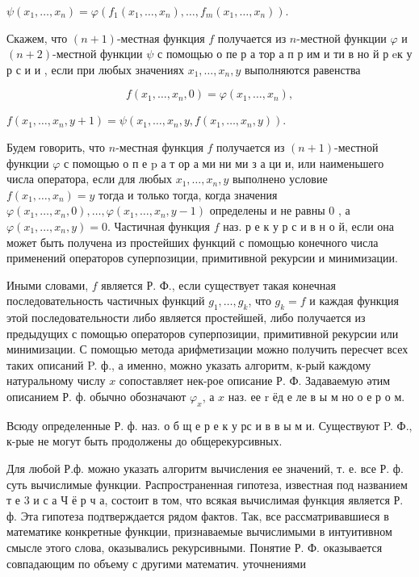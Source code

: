 \documentclass[10pt]{article}
\begin{document}
$\psi\left(x_{1}, \ldots, x_{n}\right)=\varphi\left(f_{1}\left(x_{1}, \ldots, x_{n}\right), \ldots, f_{m}\left(x_{1}, \ldots, x_{n}\right)\right)$.



Скажем, что $(n+1)$-местная функция $f$ получается из $n$-местной функции $\varphi$ и $(n+2)$-местной функции $\psi$ с помощью о пе р а тор а п р им и ти в но й р eк у р с и и , если при любых значениях $x_{1}, \ldots, x_{n}, y$ выполняются равенства



\[

f\left(x_{1}, \ldots, x_{n}, 0\right)=\varphi\left(x_{1}, \ldots, x_{n}\right),

\]



$f\left(x_{1}, \ldots, x_{n}, y+1\right)=\psi\left(x_{1}, \ldots, x_{n}, y, f\left(x_{1}, \ldots, x_{n}, y\right)\right)$.



Будем говорить, что $n$-местная функция $f$ получается из $(n+1)$-местной функции $\varphi$ с помощью о п е $\mathrm{p}$ а т ор а ми ни ми з а ци и, или наименьшего числа оператора, если для любых $x_{1}, \ldots, x_{n}, y$ выполнено условие $f\left(x_{1}, \ldots, x_{n}\right)=y$ тогда и только тогда, когда значения $\varphi\left(x_{1}, \ldots, x_{n}, 0\right), \ldots, \varphi\left(x_{1}, \ldots, x_{n}, y-1\right)$ определены и не равны 0 , а $\varphi\left(x_{1}, \ldots, x_{n}, y\right)=0$. Частичная функция $f$ наз. р е к у р с и в н о й, если она может быть получена из простейших функций с помощью конечного числа применений операторов суперпозиции, примитивной рекурсии и минимизации.



Иными словами, $f$ является Р. Ф., если существует такая конечная последовательность частичных функций $g_{1}, \ldots, g_{k}$, что $g_{k}=f$ и каждая функция этой последовательности либо является простейшей, либо получается из предыдущих с помощью операторов суперпозиции, примитивной рекурсии или минимизации. С помощью метода арифметизации можно получить пересчет всех таких описаний P. ф., а именно, можно указать алгоритм, к-рый каждому натуральному числу $x$ сопоставляет нек-рое описание Р. Ф. Задаваемую әтим описанием Р. ф. обычно обозначают $\varphi_{x}$, а $x$ наз. ее $\mathrm{r}$ ёд е ле в ы м но о е р о м.



Всюду определенные Р. ф. наз. о б щ е р е к у рс и в в ы м и. Существуют P. Ф., к-рые не могут быть продолжены до общерекурсивных.



Для любой Р.ф. можно указать алгоритм вычисления ее значений, т. е. все Р. ф. суть вычислимые функции. Распространенная гипотеза, известная под названием т е 3 и с а Ч ё р ч а, состоит в том, что всякая вычислимая функция является Р. ф. Эта гипотеза подтверждается рядом фактов. Так, все рассматривавшиеся в математике конкретные функции, признаваемые вычислимыми в интуитивном смысле этого слова, оказывались рекурсивными. Понятие Р. Ф. оказывается совпадающим по объему с другими математич. уточнениями
\end{document}
